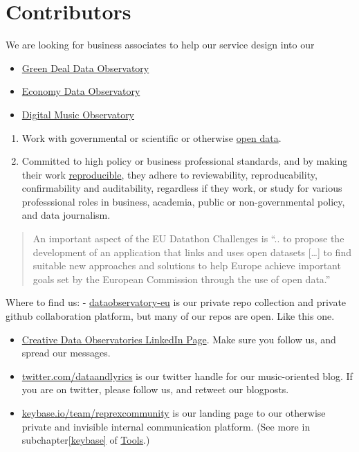 \documentclass[
  a4paper,
  openany, a4paper, oneside]{book}
\begin{document}
\hypertarget{contributors}{%
\section{Contributors}\label{contributors}}

We are looking for business associates to help our service design into our

\begin{itemize}
\item
  \href{https://greendeal.dataobservatory.eu/\#contributors}{Green Deal Data Observatory}
\item
  \href{https://economy.dataobservatory.eu/\#contributors}{Economy Data Observatory}
\item
  \href{https://music.dataobservatory.eu/\#contributors}{Digital Music Observatory}
\end{itemize}

\begin{enumerate}
\def\labelenumi{\arabic{enumi}.}
\item
  Work with governmental or scientific or otherwise \protect\hyperlink{open-data}{open data}.
\item
  Committed to high policy or business professional standards, and by making their work \protect\hyperlink{reproducible-research}{reproducible}, they adhere to reviewability, reproducability, confirmability and auditability, regardless if they work, or study for various professsional roles in business, academia, public or non-governmental policy, and data journalism.
\end{enumerate}

\begin{quote}
An important aspect of the EU Datathon Challenges is ``.. to propose the development of an application that links and uses open datasets {[}\ldots{]} to find suitable new approaches and solutions to help Europe achieve important goals set by the European Commission through the use of open data.''
\end{quote}

Where to find us:
- \href{https://github.com/dataobservatory-eu}{dataobservatory-eu} is our private repo collection and private github collaboration platform, but many of our repos are open. Like this one.

\begin{itemize}
\item
  \href{https://www.linkedin.com/company/reprexbv/}{Creative Data Observatories LinkedIn Page}. Make sure you follow us, and spread our messages.
\item
  \href{https://twitter.com/dataandlyrics}{twitter.com/dataandlyrics} is our twitter handle for our music-oriented blog. If you are on twitter, please follow us, and retweet our blogposts.
\item
  \href{https://keybase.io/team/reprexcommunity}{keybase.io/team/reprexcommunity} is our landing page to our otherwise private and invisible internal communication platform. (See more in subchapter\ref{keybase} of \protect\hyperlink{keybase}{Tools}.)
\end{itemize}
\end{document}
